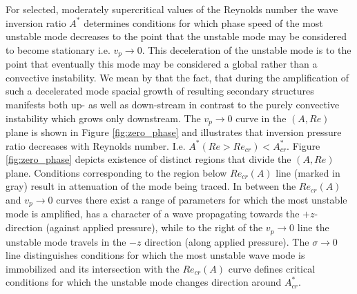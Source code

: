 \documentclass[lineno]{jfm}
\begin{document}
For selected, moderately supercritical values of the Reynolds number the wave inversion ratio $A^*$ determines conditions for which phase speed of the most unstable mode decreases to the point that the unstable mode may be considered to become stationary i.e. $v_p\to0$.
This deceleration of the unstable mode is to the point that eventually this mode may be considered
a global rather than a convective instability.
We mean by that the fact, that during the amplification of such a decelerated mode spacial growth
of resulting secondary structures manifests both up- as well as down-stream in contrast to the purely convective instability which grows only downstream.
The $v_p\to0$ curve in the  $(A,Re)$ plane is shown in Figure \ref{fig:zero_phase}
and illustrates that inversion pressure ratio decreases with Reynolds number.
I.e. $A^{*}(Re>Re_{cr})<A^{*}_{cr}$.
Figure \ref{fig:zero_phase} depicts existence of distinct regions that divide the $(A,Re)$ plane.
Conditions corresponding to the region below $Re_{cr}(A)$ line (marked in gray) result in attenuation of the mode being traced.
In between the $Re_{cr}(A)$ and $v_p\to0$ curves there exist a range of parameters for which the most unstable mode is amplified, has a character of a wave propagating towards the $+z$-direction (against applied pressure), while to the right of the $v_p\to0$ line the unstable mode
travels in the $-z$ direction (along applied pressure).
The $\sigma\to0$ line distinguishes conditions for which the most unstable wave mode is immobilized and its intersection with the $Re_{cr}(A)$ curve defines critical conditions for which the unstable mode changes direction around $A^{*}_{cr}$.


\end{document}
